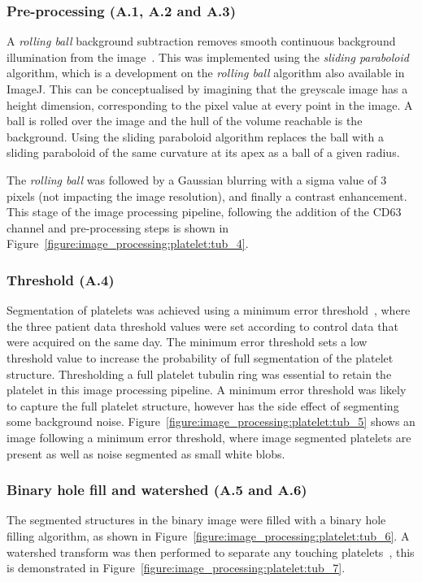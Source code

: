\subsubsection{Pre-processing (A.1, A.2 and A.3)}
A \emph{rolling ball} background subtraction removes smooth continuous background illumination from the image~\cite{Sternberg1983}. This was implemented using the \emph{sliding paraboloid} algorithm, which is a development on the \emph{rolling ball} algorithm also available in ImageJ. This can be conceptualised by imagining that the greyscale image has a height dimension, corresponding to the pixel value at every point in the image. A ball is rolled over the image and the hull of the volume reachable is the background. Using the sliding paraboloid algorithm replaces the ball with a sliding paraboloid of the same curvature at its apex as a ball of a given radius.

The \emph{rolling ball} was followed by a Gaussian blurring with a sigma value of 3 pixels (not impacting the image resolution), and finally a contrast enhancement. This stage of the image processing pipeline, following the addition of the CD63 channel and pre-processing steps is shown in Figure~\ref{figure:image_processing:platelet:tub_4}.

\subsubsection{Threshold (A.4)}
Segmentation of platelets was achieved using a minimum error threshold~\cite{Kittler1986}, where the three patient data threshold values were set according to control data that were acquired on the same day. The minimum error threshold sets a low threshold value to increase the probability of full segmentation of the platelet structure. Thresholding a full platelet tubulin ring was essential to retain the platelet in this image processing pipeline. A minimum error threshold was likely to capture the full platelet structure, however has the side effect of segmenting some background noise. Figure~\ref{figure:image_processing:platelet:tub_5} shows an image following a minimum error threshold, where image segmented platelets are present as well as noise segmented as small white blobs.

\subsubsection{Binary hole fill and watershed (A.5 and A.6)}
The segmented structures in the binary image were filled with a binary hole filling algorithm, as shown in Figure~\ref{figure:image_processing:platelet:tub_6}. A watershed transform was then performed to separate any touching platelets~\cite{Vincent1991}, this is demonstrated in Figure~\ref{figure:image_processing:platelet:tub_7}.

